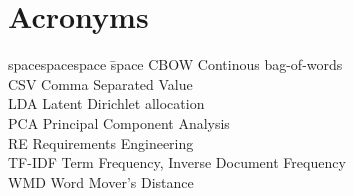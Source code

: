 \section*{Acronyms}

\begin{tabbing}
spacespacespace \= space \kill
CBOW \> Continous bag-of-words \\
CSV \> Comma Separated Value \\
LDA	\>	Latent Dirichlet allocation \\
PCA \> Principal Component Analysis\\
RE	\>	Requirements Engineering \\
TF-IDF \> Term Frequency, Inverse Document Frequency \\
WMD \> Word Mover's Distance\\
\end{tabbing}